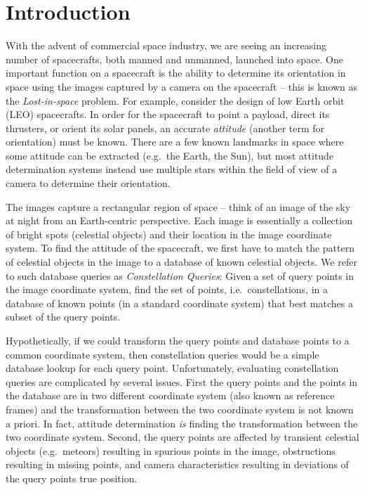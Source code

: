 \newcommand{\imageset}{\texttt{IMG}}
\newcommand{\databaseset}{\texttt{DB}}
\newcommand{\imagesubset}{b}
\newcommand{\databasesubset}{R}
\newcommand{\candidateset}{r}
\newcommand{\solutionmap}{h}

\newcommand{\genericdatabase}{\texttt{X\_DB}}
\newcommand{\angdatabase}{\texttt{ANG\_DB}}
\newcommand{\dotdatabase}{\texttt{DOT\_DB}}
\newcommand{\intdatabase}{\texttt{INT\_DB}}
\newcommand{\sphdatabase}{\texttt{SPH\_DB}}
\newcommand{\plndatabase}{\texttt{PLN\_DB}}
\newcommand{\pyrdatabase}{\texttt{PYR\_DB}}
\newcommand{\comdatabase}{\texttt{COM\_DB}}

\section{Introduction}\label{sec:introduction}
With the advent of commercial space industry, we are seeing an increasing number of spacecrafts, both manned and unmanned, launched into space.
One important function on a spacecraft is the ability to determine its orientation in space using the images captured by a camera on the spacecraft -- this is known as the \textit{Lost-in-space} problem.
For example, consider the design of low Earth orbit (LEO) spacecrafts.
In order for the spacecraft to point a payload, direct its thrusters, or orient its solar panels, an accurate \textit{attitude} (another term for orientation) must be known.
There are a few known landmarks in space where some attitude can be extracted (e.g.\ the Earth, the Sun), but most attitude determination systems instead use multiple stars within the field of view of a camera to determine their orientation.

The images capture a rectangular region of space -- think of an image of the sky at night from an Earth-centric perspective.
Each image is essentially a collection of bright spots (celestial objects) and their location in the image coordinate system.
To find the attitude of the spacecraft, we first have to match the pattern of celestial objects in the image to a database of known celestial objects.
We refer to such database queries as \textit{Constellation Queries}:
Given a set of query points in the image coordinate system, find the set of points, i.e.\ constellations, in a database of known points (in a standard coordinate system) that best matches a subset of the query points.

Hypothetically, if we could transform the query points and database points to a common coordinate system, then constellation queries would be a simple database lookup for each query point.
Unfortunately, evaluating constellation queries are complicated by several issues.
First the query points and the points in the database are in two different coordinate system (also known as reference frames) and the transformation between the two coordinate system is not known a priori.
In fact, attitude determination \emph{is} finding the transformation between the two coordinate system.
Second, the query points are affected by transient celestial objects (e.g.\ meteors) resulting in spurious points in the image, obstructions resulting in missing points, and camera characteristics resulting in deviations of the query points true position.

